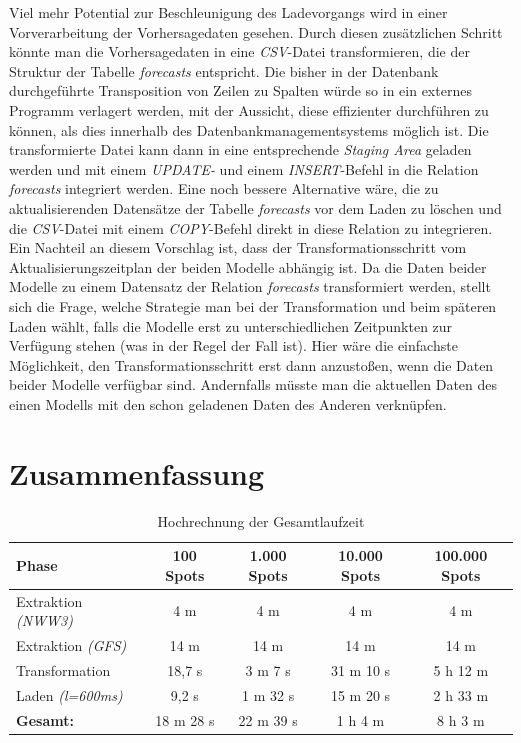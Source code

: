 Viel mehr Potential zur Beschleunigung des Ladevorgangs wird in einer
Vorverarbeitung der Vorhersagedaten gesehen. Durch diesen zusätzlichen
Schritt könnte man die Vorhersagedaten in eine \textit{CSV}-Datei
transformieren, die der Struktur der Tabelle \textit{forecasts}
entspricht. Die bisher in der Datenbank durchgeführte Transposition
von Zeilen zu Spalten würde so in ein externes Programm verlagert
werden, mit der Aussicht, diese effizienter durchführen zu können, als
dies innerhalb des Datenbankmanagementsystems möglich ist. Die
transformierte Datei kann dann in eine entsprechende \textit{Staging
  Area} geladen werden und mit einem \textit{UPDATE-} und einem
\textit{INSERT}-Befehl in die Relation \textit{forecasts} integriert
werden. Eine noch bessere Alternative wäre, die zu aktualisierenden
Datensätze der Tabelle \textit{forecasts} vor dem Laden zu löschen und
die \textit{CSV}-Datei mit einem \textit{COPY}-Befehl direkt in diese
Relation zu integrieren. Ein Nachteil an diesem Vorschlag ist, dass
der Transformationsschritt vom Aktualisierungszeitplan der beiden
Modelle abhängig ist. Da die Daten beider Modelle zu einem Datensatz
der Relation \textit{forecasts} transformiert werden, stellt sich die
Frage, welche Strategie man bei der Transformation und beim späteren
Laden wählt, falls die Modelle erst zu unterschiedlichen Zeitpunkten
zur Verfügung stehen (was in der Regel der Fall ist). Hier wäre die
einfachste Möglichkeit, den Transformationsschritt erst dann
anzustoßen, wenn die Daten beider Modelle verfügbar sind. Andernfalls
müsste man die aktuellen Daten des einen Modells mit den schon
geladenen Daten des Anderen verknüpfen.

\section{Zusammenfassung}
\begin{table}[h]
  \centering
  {\sf
    \footnotesize
    \begin{longtable}{l|c|c|c|c}
      \toprule
      \textbf{Phase} & \textbf{100 Spots} & \textbf{1.000 Spots} & \textbf{10.000 Spots} & \textbf{100.000 Spots}\\
      \midrule
      Extraktion \textit{(NWW3)} & 4 m & 4 m & 4 m & 4 m \\
      Extraktion \textit{(GFS)} & 14 m & 14 m & 14 m & 14 m \\
      \midrule
      Transformation & 18,7 s & 3 m 7 s & 31 m 10 s & 5 h 12 m \\
      Laden \textit{(l=600ms)} & 9,2 s & 1 m 32 s & 15 m 20 s & 2 h 33 m \\
      \bottomrule
      \textbf{Gesamt:} & 18 m 28 s & 22 m 39 s & 1 h 4 m & 8 h 3 m \\
      \bottomrule
    \end{longtable}
  }
  \caption{Hochrechnung der Gesamtlaufzeit}
  \label{tab:gesamt_laufzeit}
\end{table}

